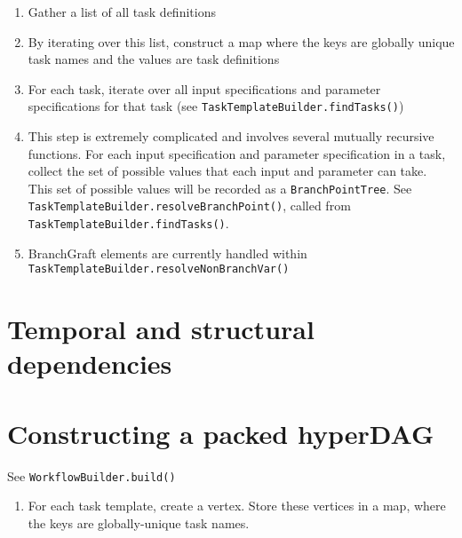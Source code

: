 \documentclass{report}
\begin{document}
\begin{enumerate}

\item Gather a list of all task definitions

\item By iterating over this list, construct a map where 
      the keys are globally unique task names and 
      the values are task definitions

\item For each task, iterate over all input specifications and parameter specifications for that task
      (see \texttt{TaskTemplateBuilder.findTasks()})

\item This step is extremely complicated and involves several mutually recursive functions.
      For each input specification and parameter specification in a task, 
      collect the set of possible values that each input and parameter can take. 
      This set of possible values will be recorded as a \texttt{BranchPointTree}.
      See \texttt{TaskTemplateBuilder.resolveBranchPoint()}, called from \texttt{TaskTemplateBuilder.findTasks()}.
      
\item BranchGraft elements are currently handled within \texttt{TaskTemplateBuilder.resolveNonBranchVar()}

\end{enumerate}


\section{Temporal and structural dependencies}

\section{Constructing a packed hyperDAG}

See \texttt{WorkflowBuilder.build()}

\begin{enumerate}
\item For each task template, create a vertex. Store these vertices in a map, where the keys are globally-unique task names.
\end{enumerate}




\end{document}
